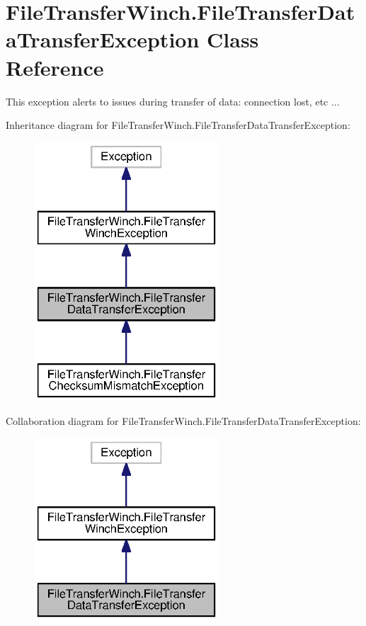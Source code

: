 \section{File\+Transfer\+Winch.\+File\+Transfer\+Data\+Transfer\+Exception Class Reference}
\label{classorg_1_1smallfoot_1_1filexfer_1_1FileTransferWinch_1_1FileTransferDataTransferException}


This exception alerts to issues during transfer of data\+: connection lost, etc ...  




Inheritance diagram for File\+Transfer\+Winch.\+File\+Transfer\+Data\+Transfer\+Exception\+:\nopagebreak
\begin{figure}[H]
\begin{center}
\leavevmode
\includegraphics[width=196pt]{classorg_1_1smallfoot_1_1filexfer_1_1FileTransferWinch_1_1FileTransferDataTransferException__inherit__graph}
\end{center}
\end{figure}


Collaboration diagram for File\+Transfer\+Winch.\+File\+Transfer\+Data\+Transfer\+Exception\+:\nopagebreak
\begin{figure}[H]
\begin{center}
\leavevmode
\includegraphics[width=196pt]{classorg_1_1smallfoot_1_1filexfer_1_1FileTransferWinch_1_1FileTransferDataTransferException__coll__graph}
\end{center}
\end{figure}
